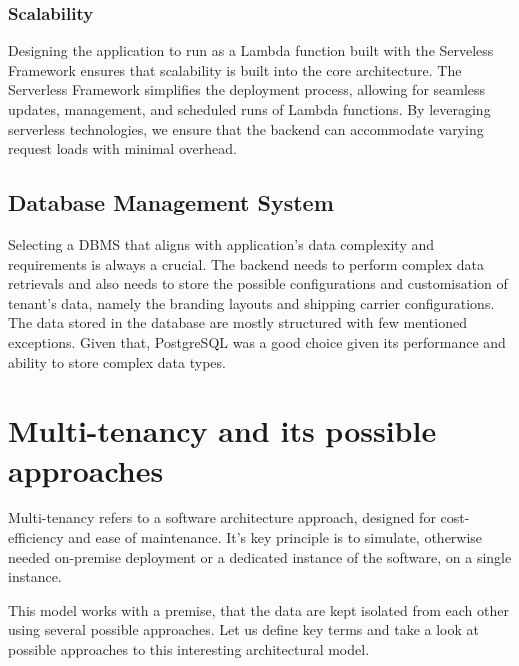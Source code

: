 \subsubsection{Scalability}
Designing the application to run as a Lambda function built with the Serveless Framework ensures that scalability is built into the core architecture.
The Serverless Framework simplifies the deployment process, allowing for seamless updates, management, and scheduled runs of Lambda functions.
By leveraging serverless technologies, we ensure that the backend can accommodate varying request loads with minimal overhead.



\subsection{Database Management System}
\label{subsec:dbms}
Selecting a \ac{DBMS} that aligns with application's data complexity and requirements is always a crucial. 
The backend needs to perform complex data retrievals and also needs to store the possible configurations and customisation of tenant's data, namely the branding layouts and shipping carrier configurations.
The data stored in the database are mostly structured with few mentioned exceptions.
Given that, PostgreSQL was a good choice given its performance and ability to store complex data types.

\section{Multi-tenancy and its possible approaches}
\label{sec:different-approaches-for-multitanency}
Multi-tenancy refers to a software architecture approach, designed for cost-efficiency and ease of maintenance.
It's key principle is to simulate, otherwise needed on-premise deployment or a dedicated instance of the software, on a single instance.

This model works with a premise, that the data are kept isolated from each other using several possible approaches.
Let us define key terms and take a look at possible approaches to this interesting architectural model.

